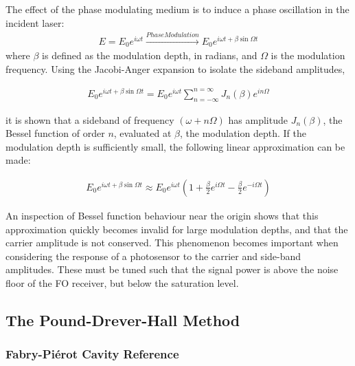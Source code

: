 The effect of the phase modulating medium is to induce a phase oscillation in the incident laser:
\begin{gather}
  E = E_0 e^{i\omega t} \xrightarrow{Phase Modulation}
    E_0 e^{i \omega t + \beta \sin \Omega t}
\end{gather}
where $\beta$ is defined as the modulation depth, in radians, and $\Omega$ is the modulation frequency. Using the Jacobi-Anger expansion to isolate the sideband amplitudes,

\begin{gather}
  E_0 e^{i \omega t + \beta \sin \Omega t}  =
  E_0 e^{i\omega t} \sum_{n = -\infty}^{n = \infty} J_n(\beta)e^{in\Omega}
\end{gather}

it is shown that a sideband of frequency $(\omega +n\Omega)$ has amplitude $J_n(\beta)$, the Bessel function of order $n$, evaluated at $\beta$, the modulation depth. If the modulation depth is sufficiently small, the following linear approximation can be made:

\begin{gather}
  E_0 e^{i \omega t + \beta \sin \Omega t}  \approx
    E_0 e^{i\omega t} \left(1 + \frac{\beta}{2}e^{i\Omega t} -
      \frac{\beta}{2} e^{-i\Omega t} \right)
\end{gather}

An inspection of Bessel function behaviour near the origin shows that this approximation quickly becomes invalid for large modulation depths, and that the carrier amplitude is not conserved. This phenomenon becomes important when considering the response of a photosensor to the carrier and side-band amplitudes. These must be tuned such that the signal power is above the noise floor of the FO receiver, but below the saturation level.


\subsection{The Pound-Drever-Hall Method}

\subsubsection{Fabry-Pi{\'e}rot Cavity Reference}

